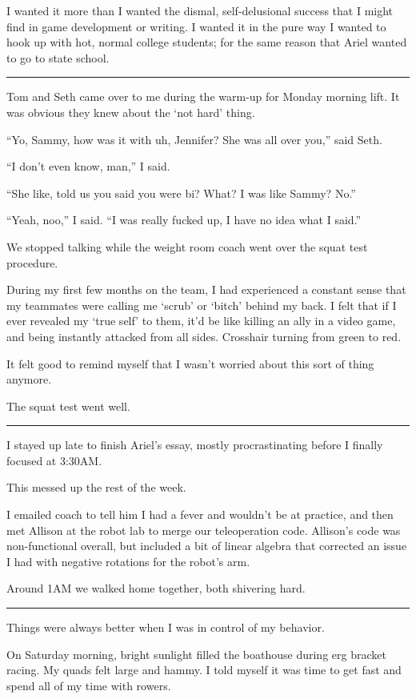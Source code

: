 I wanted it more than I wanted the dismal, self-delusional success that I might
find in game development or writing.  I wanted it in the pure way I wanted to
hook up with hot, normal college students; for the same reason that Ariel
wanted to go to state school.

\plainfancybreak{12pt}{2}{}

Tom and Seth came over to me during the warm-up for Monday morning lift.  It
was obvious they knew about the `not hard' thing.

``Yo, Sammy, how was it with uh, Jennifer?  She was all over you,'' said
Seth.

``I don't even know, man,'' I said.

``She like, told us you said you were bi?  What?  I was like Sammy?  No.''

``Yeah, noo,'' I said. ``I was really fucked up, I have no idea what I said.''

We stopped talking while the weight room coach went over the squat test
procedure.

During my first few months on the team, I had experienced a constant sense that
my teammates were calling me `scrub' or `bitch' behind my back.  I felt that if
I ever revealed my `true self' to them, it'd be like killing an ally in a video
game, and being instantly attacked from all sides. Crosshair turning from green
to red.

It felt good to remind myself that I wasn't worried about this sort of thing
anymore.

The squat test went well.

\plainfancybreak{12pt}{2}{}

I stayed up late to finish Ariel's essay, mostly procrastinating before I
finally focused at 3:30AM.

This messed up the rest of the week.

I emailed coach to tell him I had a fever and wouldn't be at practice, and then
met Allison at the robot lab to merge our teleoperation code.   Allison's code
was non-functional overall, but included a bit of linear algebra that corrected
an issue I had with negative rotations for the robot's arm.

Around 1AM we walked home together, both shivering hard.

\plainfancybreak{12pt}{2}{}

Things were always better when I was in control of my behavior.

On Saturday morning, bright sunlight filled the boathouse during erg bracket
racing.  My quads felt large and hammy.  I told myself it was time to get fast
and spend all of my time with rowers.

